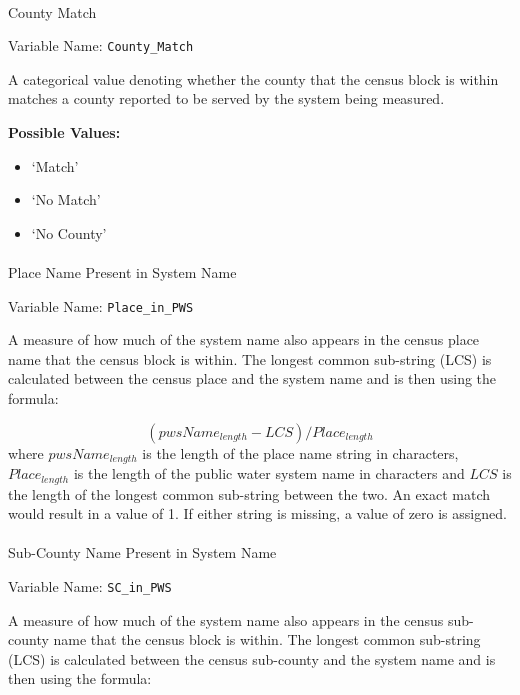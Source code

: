 \documentclass[12pt]{article}
\makeatletter
\providecommand{\tightlist}{%
  \setlength{\itemsep}{0pt}\setlength{\parskip}{0pt}}
\let\oldparagraph\paragraph
\renewcommand{\paragraph}{
    \@ifstar
      \xxxParagraphStar
      \xxxParagraphNoStar
  }
\newcommand{\xxxParagraphStar}[1]{\oldparagraph*{#1}\mbox{}}
\newcommand{\xxxParagraphNoStar}[1]{\oldparagraph{#1}\mbox{}}
\makeatother
\begin{document}
\paragraph{County Match}\label{county-match}

Variable Name: \texttt{County\_Match}

A categorical value denoting whether the county that the census block is
within matches a county reported to be served by the system being
measured.

\textbf{Possible Values:}

\begin{itemize}
\tightlist
\item
  `Match'
\item
  `No Match'
\item
  `No County'
\end{itemize}

\paragraph{Place Name Present in System
Name}\label{place-name-present-in-system-name}

Variable Name: \texttt{Place\_in\_PWS}

A measure of how much of the system name also appears in the census
place name that the census block is within. The longest common
sub-string (LCS) is calculated between the census place and the system
name and is then using the formula:

\[(pwsName_{length}-LCS)/Place_{length}\] where \(pwsName_{length}\) is
the length of the place name string in characters, \(Place_{length}\) is
the length of the public water system name in characters and \(LCS\) is
the length of the longest common sub-string between the two. An exact
match would result in a value of 1. If either string is missing, a value
of zero is assigned.

\paragraph{Sub-County Name Present in System
Name}\label{sub-county-name-present-in-system-name}

Variable Name: \texttt{SC\_in\_PWS}

A measure of how much of the system name also appears in the census
sub-county name that the census block is within. The longest common
sub-string (LCS) is calculated between the census sub-county and the
system name and is then using the formula:
\end{document}
